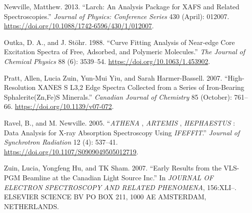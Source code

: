 \documentclass[
]{article}
\newlength{\cslhangindent}
\newlength{\cslentryspacingunit} %
\newenvironment{CSLReferences}[2] %
 {%
  \setlength{\parindent}{0pt}
  \ifodd #1
  \let\oldpar\par
  \def\par{\hangindent=\cslhangindent\oldpar}
  \fi
  \setlength{\parskip}{#2\cslentryspacingunit}
 }%
 {}
\begin{document}
\begin{CSLReferences}{1}{0}
\leavevmode{}%
Newville, Matthew. 2013. {``Larch: {An Analysis Package} for {XAFS} and
{Related Spectroscopies}.''} \emph{Journal of Physics: Conference
Series} 430 (April): 012007.
\url{https://doi.org/10.1088/1742-6596/430/1/012007}.

\leavevmode{}%
Outka, D. A., and J. Stöhr. 1988. {``Curve Fitting Analysis of Near‐edge
Core Excitation Spectra of Free, Adsorbed, and Polymeric Molecules.''}
\emph{The Journal of Chemical Physics} 88 (6): 3539--54.
\url{https://doi.org/10.1063/1.453902}.

\leavevmode{}%
Pratt, Allen, Lucia Zuin, Yun-Mui Yiu, and Sarah Harmer-Bassell. 2007.
{``High-Resolution {XANES S L3},2 Edge Spectra Collected from a Series
of Iron-Bearing Sphalerite({Zn},{Fe}){S} Minerals.''} \emph{Canadian
Journal of Chemistry} 85 (October): 761--66.
\url{https://doi.org/10.1139/v07-072}.

\leavevmode{}%
Ravel, B., and M. Newville. 2005. {``{\emph{ATHENA}} , {\emph{ARTEMIS}}
, {\emph{HEPHAESTUS}} : Data Analysis for {X-ray} Absorption
Spectroscopy Using {\emph{IFEFFIT}}.''} \emph{Journal of Synchrotron
Radiation} 12 (4): 537--41.
\url{https://doi.org/10.1107/S0909049505012719}.

\leavevmode{}%
Zuin, Lucia, Yongfeng Hu, and TK Sham. 2007. {``Early Results from the
{VLS-PGM} Beamline at the {Canadian} Light Source {Inc}.''} In
\emph{{JOURNAL OF ELECTRON SPECTROSCOPY AND RELATED PHENOMENA}},
156:XLI--. {ELSEVIER SCIENCE BV PO BOX 211, 1000 AE AMSTERDAM,
NETHERLANDS}.

\end{CSLReferences}
\end{document}
